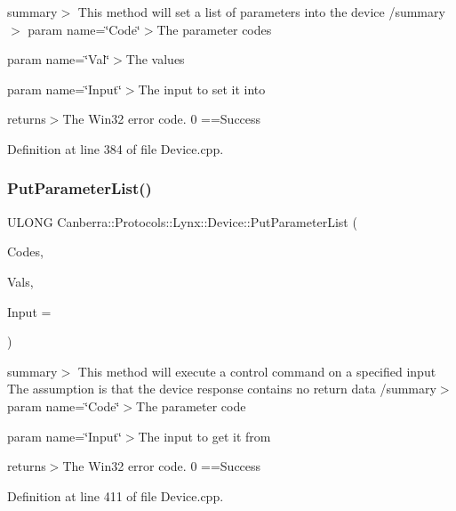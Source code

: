 summary$>$ This method will set a list of parameters into the device /summary$>$ param name=\char`\"{}\+Code\char`\"{}$>$The parameter codes

param name=\char`\"{}\+Val\char`\"{}$>$The values

param name=\char`\"{}\+Input\char`\"{}$>$The input to set it into

returns$>$The Win32 error code. 0 ==Success

Definition at line 384 of file Device.\+cpp.

\mbox{\label{class_canberra_1_1_protocols_1_1_lynx_1_1_device_a2ba667c88f72053137db2d913f957d47_a2ba667c88f72053137db2d913f957d47}} 
\subsubsection{\texorpdfstring{Put\+Parameter\+List()}{PutParameterList()}}
{\footnotesize\ttfamily U\+L\+O\+NG Canberra\+::\+Protocols\+::\+Lynx\+::\+Device\+::\+Put\+Parameter\+List (\begin{DoxyParamCaption}\item[{std\+::vector$<$ L\+O\+NG $>$ \&}]{Codes,  }\item[{std\+::vector$<$ \hyperlink{class_canberra_1_1_utility_1_1_core_1_1_variant}{Canberra\+::\+Utility\+::\+Core\+::\+Variant} $>$ \&}]{Vals,  }\item[{U\+S\+H\+O\+RT}]{Input = {} }\end{DoxyParamCaption})}

summary$>$ This method will execute a control command on a specified input The assumption is that the device response contains no return data /summary$>$ param name=\char`\"{}\+Code\char`\"{}$>$The parameter code

param name=\char`\"{}\+Input\char`\"{}$>$The input to get it from

returns$>$The Win32 error code. 0 ==Success

Definition at line 411 of file Device.\+cpp.

\mbox{\label{class_canberra_1_1_protocols_1_1_lynx_1_1_device_a28e7caa3973967170dbc445771644193_a28e7caa3973967170dbc445771644193}} 
